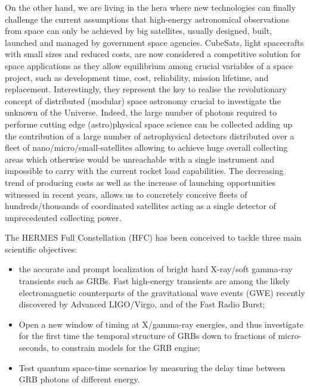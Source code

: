 \documentclass[]{spie}  %
\begin{document}
On the other hand, we are living in the hera where new technologies can finally challenge the current assumptions that high-energy astronomical observations from space can only be achieved by big satellites, usually designed, built, launched and managed by government space agencies. CubeSats, light spacecrafts with small sizes and reduced costs, are now considered a competitive solution for space applications as they allow equilibrium among crucial variables of a space project, such as development time, cost, reliability, mission lifetime, and replacement. Interestingly, they represent the key to realise the revolutionary concept of distributed (modular) space astronomy crucial to investigate the unknown of the Universe. Indeed, the large number of photons required to performe cutting edge (astro)physical space science can be collected adding up the contribution of a large number of astrophysical detectors distributed over a fleet of nano/micro/small-satellites allowing to achieve huge overall collecting areas which otherwise would be unreachable with a single instrument and impossible to carry with the current rocket load capabilities. The decreasing trend of producing costs as well as the increase of launching opportunities witnessed in recent years, allows us to concretely conceive fleets of hundreds/thousands of coordinated satellites acting as a single detector of unprecedented collecting power.


The HERMES Full Constellation (HFC) has been conceived to tackle three main scientific objectives: 
\begin{itemize}
\item the accurate and prompt localization of bright hard X-ray/soft gamma-ray transients such as GRBs. Fast high-energy transients are among the likely electromagnetic counterparts of the gravitational wave events (GWE) recently discovered by Advanced LIGO/Virgo, and of the Fast Radio Burst; 
\item Open a new window of timing at X/gamma-ray energies, and thus investigate for the first time the temporal structure of GRBs down to fractions of micro-seconds, to constrain models for the GRB engine;
\item Test quantum space-time scenarios by measuring the delay time between GRB photons of different energy.
\end{itemize}
\end{document}
